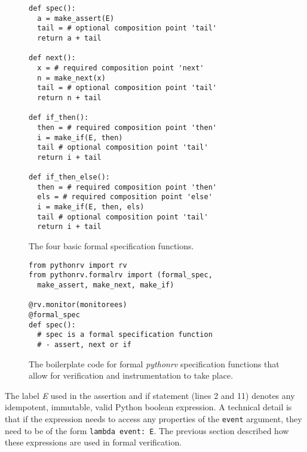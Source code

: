 \begin{figure}[h!]
	\begin{center}
	\begin{minipage}{0.7\textwidth}
	\begin{lstlisting}
def spec():
  a = make_assert(E)
  tail = # optional composition point 'tail'
  return a + tail

def next():
  x = # required composition point 'next'
  n = make_next(x)
  tail = # optional composition point 'tail'
  return n + tail

def if_then():
  then = # required composition point 'then'
  i = make_if(E, then)
  tail # optional composition point 'tail'
  return i + tail

def if_then_else():
  then = # required composition point 'then'
  els = # required composition point 'else'
  i = make_if(E, then, els)
  tail # optional composition point 'tail'
  return i + tail
	\end{lstlisting}
	\end{minipage}
	\end{center}

	\caption{The four basic formal specification functions.}
	\label{figure-basic-formal-specification-functions}
\end{figure}

\begin{figure}[h!]
	\begin{center}
	\begin{minipage}{0.7\textwidth}
	\begin{lstlisting}
from pythonrv import rv
from pythonrv.formalrv import (formal_spec,
  make_assert, make_next, make_if)

@rv.monitor(monitorees)
@formal_spec
def spec():
  # spec is a formal specification function
  # - assert, next or if
	\end{lstlisting}
	\end{minipage}
	\end{center}

  \caption{The boilerplate code for formal \textit{pythonrv} specification
  functions that allow for verification and instrumentation to take place.}
	\label{figure-formal-boilerplate}
\end{figure}

The label \textit{E} used in the assertion and if statement (lines 2 and 11)
denotes any idempotent, immutable, valid Python boolean expression. A technical
detail is that if the expression needs to access any properties of the
\texttt{event} argument, they need to be of the form \texttt{lambda event: E}.
The previous section described how these expressions are used in formal
verification.

